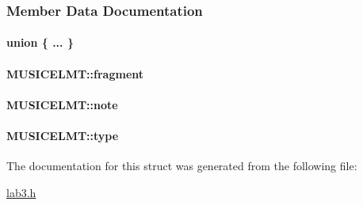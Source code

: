 \subsubsection{Member Data Documentation}
\hypertarget{structMUSICELMT_af2898ea8d200b7d7c051d968d37e4788}{\paragraph[{"@1}]{\setlength{\rightskip}{0pt plus 5cm}union \{ ... \} }}\label{structMUSICELMT_af2898ea8d200b7d7c051d968d37e4788}
\hypertarget{structMUSICELMT_ae418bce8087e7510ad8563a87b4c1c63}{
\paragraph[{fragment}]{ M\+U\+S\+I\+C\+E\+L\+M\+T\+::fragment}}\label{structMUSICELMT_ae418bce8087e7510ad8563a87b4c1c63}
\hypertarget{structMUSICELMT_a662fdb18330107012ed8902725b08e5c}{
\paragraph[{note}]{ M\+U\+S\+I\+C\+E\+L\+M\+T\+::note}}\label{structMUSICELMT_a662fdb18330107012ed8902725b08e5c}
\hypertarget{structMUSICELMT_aa9a541d279b1a98b190c1968217ad37f}{
\paragraph[{type}]{ M\+U\+S\+I\+C\+E\+L\+M\+T\+::type}}\label{structMUSICELMT_aa9a541d279b1a98b190c1968217ad37f}


The documentation for this struct was generated from the following file\+:\begin{DoxyCompactItemize}
\item 
\hyperlink{lab3_8h}{lab3.\+h}\end{DoxyCompactItemize}
